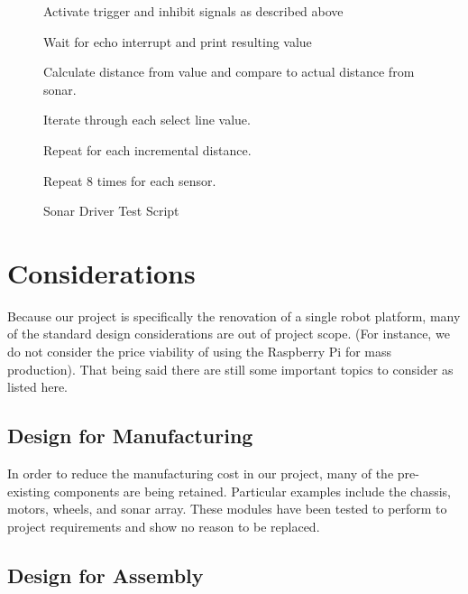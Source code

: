 \documentclass{article}
\begin{document}
\begin{figure}[htb]
\begin{framed}
\begin{enumerate*}
\begin{enumerate*}
                \item Activate trigger and inhibit signals as described above
                \item Wait for echo interrupt and print resulting value
                \item Calculate distance from value
                and compare to actual distance from sonar.
                \item Iterate through each select line value.
            \end{enumerate*}
            \item Repeat for each incremental distance.
            \item Repeat 8 times for each sensor.
        \end{enumerate*}
        \end{framed}
        \caption{Sonar Driver Test Script}
        \label{fig:software_script}
    \end{figure}

\FloatBarrier
\section{Considerations}
    \label{sec:considerations}
    
    Because our project is specifically the renovation of a single robot platform,
    many of the standard design considerations are out of project scope. (For instance,
    we do not consider the price viability of using the Raspberry Pi for mass production).
    That being said there are still some important topics to consider as listed here.
    
        \subsection{Design for Manufacturing}

            In order to reduce the manufacturing cost in our project,
            many of the pre-existing components are being retained.
            Particular examples include the chassis, motors, wheels, and sonar array.
            These modules have been tested to perform to project requirements
            and show no reason to be replaced.
    
        \subsection{Design for Assembly}
\end{document}
